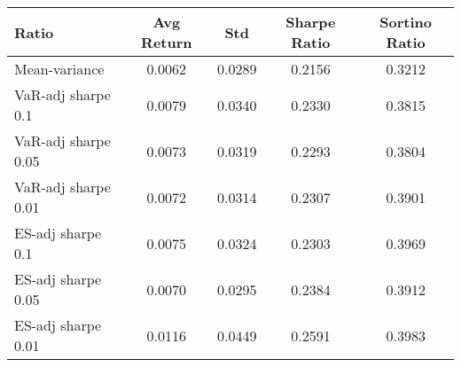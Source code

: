 \begin{tabular}{lcccc}
\toprule
Ratio & Avg Return & Std & Sharpe Ratio & Sortino Ratio\\
\midrule
Mean-variance & 0.0062 & 0.0289 & 0.2156 & 0.3212\\
VaR-adj sharpe 0.1 & 0.0079 & 0.0340 & 0.2330 & 0.3815\\
VaR-adj sharpe 0.05 & 0.0073 & 0.0319 & 0.2293 & 0.3804\\
VaR-adj sharpe 0.01 & 0.0072 & 0.0314 & 0.2307 & 0.3901\\
ES-adj sharpe 0.1 & 0.0075 & 0.0324 & 0.2303 & 0.3969\\
ES-adj sharpe 0.05 & 0.0070 & 0.0295 & 0.2384 & 0.3912\\
ES-adj sharpe 0.01 & 0.0116 & 0.0449 & 0.2591 & 0.3983\\
\bottomrule
\end{tabular}
